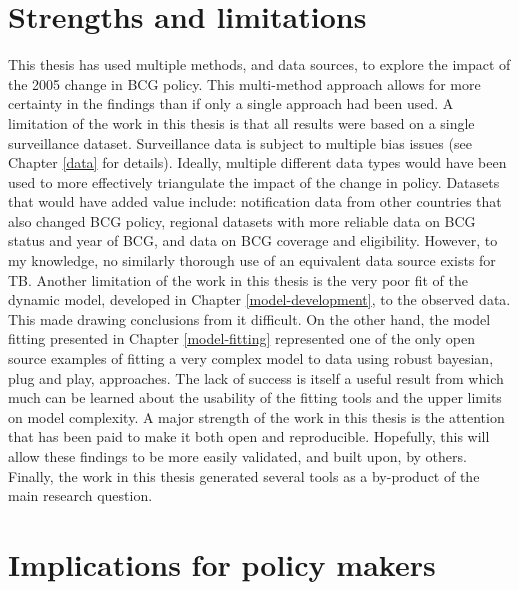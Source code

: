 \documentclass[11pt,twoside]{bristolthesis}
\begin{document}
  \hypertarget{strengths-and-limitations}{%
  \section{Strengths and limitations}\label{strengths-and-limitations}}
  
  This thesis has used multiple methods, and data sources, to explore the impact of the 2005 change in BCG policy. This multi-method approach allows for more certainty in the findings than if only a single approach had been used. A limitation of the work in this thesis is that all results were based on a single surveillance dataset. Surveillance data is subject to multiple bias issues (see Chapter \ref{data} for details). Ideally, multiple different data types would have been used to more effectively triangulate the impact of the change in policy. Datasets that would have added value include: notification data from other countries that also changed BCG policy, regional datasets with more reliable data on BCG status and year of BCG, and data on BCG coverage and eligibility. However, to my knowledge, no similarly thorough use of an equivalent data source exists for TB. Another limitation of the work in this thesis is the very poor fit of the dynamic model, developed in Chapter \ref{model-development}, to the observed data. This made drawing conclusions from it difficult. On the other hand, the model fitting presented in Chapter \ref{model-fitting} represented one of the only open source examples of fitting a very complex model to data using robust bayesian, plug and play, approaches. The lack of success is itself a useful result from which much can be learned about the usability of the fitting tools and the upper limits on model complexity. A major strength of the work in this thesis is the attention that has been paid to make it both open and reproducible. Hopefully, this will allow these findings to be more easily validated, and built upon, by others. Finally, the work in this thesis generated several tools as a by-product of the main research question.
  
  \hypertarget{implications-for-policy-makers}{%
  \section{Implications for policy makers}\label{implications-for-policy-makers}}
  
\end{document}

